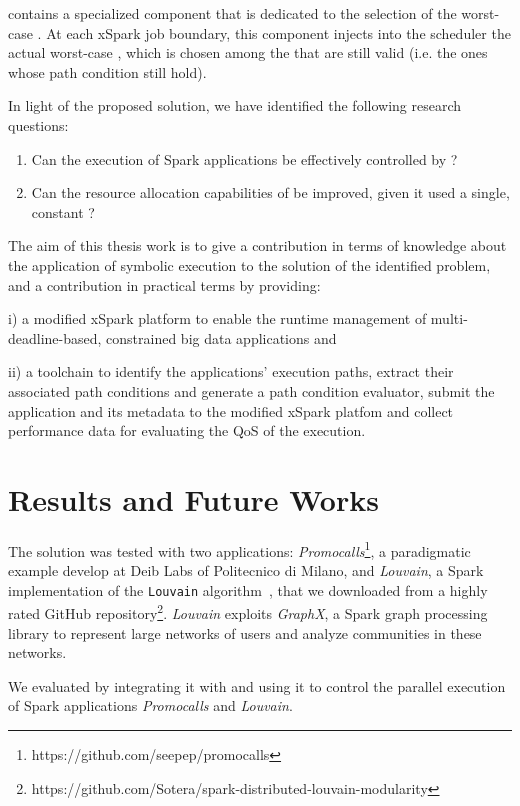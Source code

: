 \tool contains a specialized   component that is dedicated to the selection of the worst-case \plan. At each xSpark job boundary, this component injects into the \cSpark scheduler the actual worst-case \plan, which is chosen among the \plans that are still valid (i.e. the ones whose path condition still hold). 

In light of the proposed solution, we have identified the following research questions:

\begin{enumerate}[\boldmath$RQ_1 : $] 
	\item Can the execution of Spark applications be effectively controlled by \dSymb?
	\item Can the resource allocation capabilities of \cSpark be improved, given it used a single, constant \plan?
\end{enumerate}

 The aim of this thesis work is to give a contribution in terms of knowledge about the application of symbolic execution to the solution of the identified problem, and a contribution in practical terms by providing: 
 
 i) a modified xSpark platform to enable the runtime management of multi-\plan deadline-based, \qos constrained big data applications and 
 
 ii) a toolchain to identify the applications' execution paths, extract their associated path conditions and generate a path condition evaluator, submit the application and its metadata to the modified xSpark platfom and collect performance data for evaluating the QoS of the execution. 

\section*{Results and Future Works}\label{sec:results_future_works}
The solution was tested with two applications:  \textit{Promocalls}\footnote{https://github.com/seepep/promocalls}, a paradigmatic example  develop at Deib Labs of Politecnico di Milano, and \textit{Louvain}, a Spark implementation of the \texttt{Louvain} algorithm~\cite{Louvain}, that we downloaded from a highly rated GitHub repository\footnote{https://github.com/Sotera/spark-distributed-louvain-modularity}. \textit{Louvain} exploits \textit{GraphX}, a Spark graph processing library to represent large networks of users and analyze communities in these networks. 

We evaluated \dSymb by integrating it with \cSpark and using it to control the parallel execution of Spark applications \textit{Promocalls} and \textit{Louvain}. 

